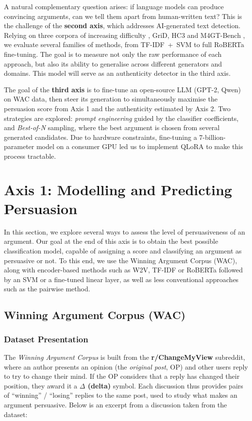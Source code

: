 \documentclass[11pt,a4paper]{article}
\begin{document}
A natural complementary question arises: if language models can produce
convincing arguments, can we tell them apart from human-written text? This
is the challenge of the \textbf{second axis}, which addresses AI-generated text
detection. Relying on three corpora of increasing difficulty , GriD, HC3
and M4GT-Bench , we evaluate several families of methods, from
TF-IDF~+~SVM to full RoBERTa fine-tuning. The goal is to measure not only
the raw performance of each approach, but also its ability to generalise
across different generators and domains. This model will serve as an
authenticity detector in the third axis.

The goal of the \textbf{third axis} is to fine-tune an open-source LLM (GPT-2,
Qwen) on WAC data, then steer its generation to simultaneously maximise
the persuasion score from Axis 1 and the authenticity estimated by Axis 2.
Two strategies are explored: \textit{prompt engineering} guided by the
classifier coefficients, and \textit{Best-of-N} sampling, where the best
argument is chosen from several generated candidates. Due to hardware
constraints, fine-tuning a 7-billion-parameter model on a consumer GPU
led us to implement QLoRA to make this process tractable.

\newpage

\section{Axis 1: Modelling and Predicting Persuasion}

In this section, we explore several ways to assess the level of persuasiveness
of an argument. Our goal at the end of this axis is to obtain the best possible
classification model, capable of assigning a score and classifying an argument
as persuasive or not. To this end, we use the Winning Argument Corpus (WAC),
along with encoder-based methods such as W2V, TF-IDF or RoBERTa followed by
an SVM or a fine-tuned linear layer, as well as less conventional approaches
such as the pairwise method.



\subsection{Winning Argument Corpus (WAC)}
\subsubsection{Dataset Presentation}
The \emph{Winning Argument Corpus} is built from the \textbf{r/ChangeMyView}
subreddit, where an author presents an opinion (the \emph{original post}, OP)
and other users reply to try to change their mind. If the OP considers that
a reply has changed their position, they award it a \textbf{$\Delta$ (delta)}
symbol. Each discussion thus provides pairs of ``winning'' / ``losing'' replies
to the same post, used to study what makes an argument persuasive. Below is
an excerpt from a discussion taken from the dataset:
\end{document}
